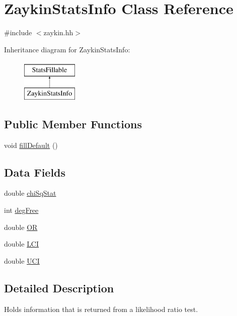 \hypertarget{classZaykinStatsInfo}{
\section{ZaykinStatsInfo Class Reference}
\label{classZaykinStatsInfo}
}


{\ttfamily \#include $<$zaykin.hh$>$}

Inheritance diagram for ZaykinStatsInfo:\begin{figure}[H]
\begin{center}
\leavevmode
\includegraphics[height=2cm]{classZaykinStatsInfo}
\end{center}
\end{figure}
\subsection*{Public Member Functions}
\begin{DoxyCompactItemize}
\item 
void \hyperlink{classZaykinStatsInfo_ac10ab8cf255d518161ce459ebcfdc8a4}{fillDefault} ()
\end{DoxyCompactItemize}
\subsection*{Data Fields}
\begin{DoxyCompactItemize}
\item 
double \hyperlink{classZaykinStatsInfo_a28b66e969cdfd1f819ab622993aeea62}{chiSqStat}
\item 
int \hyperlink{classZaykinStatsInfo_aab543cdaa2227c8eda01598259bd0497}{degFree}
\item 
double \hyperlink{classZaykinStatsInfo_a75784cfcc143155568b6877fafe7c4a6}{OR}
\item 
double \hyperlink{classZaykinStatsInfo_a427af93fef8a99a23312fc42b14b85ae}{LCI}
\item 
double \hyperlink{classZaykinStatsInfo_ae32b8c048ddaddd014e5cb33943a3167}{UCI}
\end{DoxyCompactItemize}


\subsection{Detailed Description}
Holds information that is returned from a likelihood ratio test. 

